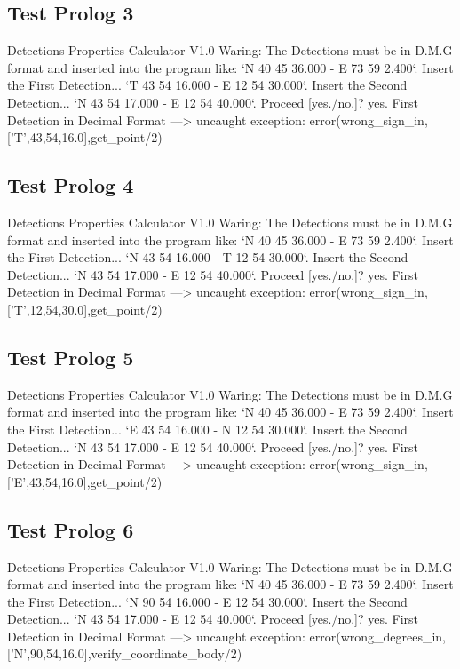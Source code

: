 \documentclass{article}
\begin{document}
\subsection*{Test Prolog 3}
	\begin{spverbatim}
		Detections Properties Calculator V1.0
		Waring: The Detections must be in D.M.G format and inserted into the program like: `N 40 45 36.000 - E 73 59 2.400`.
		Insert the First Detection...
		`T 43 54 16.000 - E 12 54 30.000`.
		Insert the Second Detection...
		`N 43 54 17.000 - E 12 54 40.000`.
		Proceed [yes./no.]?
		yes.
		First Detection in Decimal Format ---> 
		uncaught exception: error(wrong_sign_in,['T',43,54,16.0],get_point/2)
	\end{spverbatim}

\subsection*{Test Prolog 4}
	\begin{spverbatim}
		Detections Properties Calculator V1.0
		Waring: The Detections must be in D.M.G format and inserted into the program like: `N 40 45 36.000 - E 73 59 2.400`.
		Insert the First Detection...
		`N 43 54 16.000 - T 12 54 30.000`.
		Insert the Second Detection...
		`N 43 54 17.000 - E 12 54 40.000`.
		Proceed [yes./no.]?
		yes.
		First Detection in Decimal Format ---> 
		uncaught exception: error(wrong_sign_in,['T',12,54,30.0],get_point/2)
	\end{spverbatim}

\subsection*{Test Prolog 5}
	\begin{spverbatim}
		Detections Properties Calculator V1.0
		Waring: The Detections must be in D.M.G format and inserted into the program like: `N 40 45 36.000 - E 73 59 2.400`.
		Insert the First Detection...
		`E 43 54 16.000 - N 12 54 30.000`.
		Insert the Second Detection...
		`N 43 54 17.000 - E 12 54 40.000`.
		Proceed [yes./no.]?
		yes.
		First Detection in Decimal Format ---> 
		uncaught exception: error(wrong_sign_in,['E',43,54,16.0],get_point/2)
	\end{spverbatim}

\subsection*{Test Prolog 6}
	\begin{spverbatim}
		Detections Properties Calculator V1.0
		Waring: The Detections must be in D.M.G format and inserted into the program like: `N 40 45 36.000 - E 73 59 2.400`.
		Insert the First Detection...
		`N 90 54 16.000 - E 12 54 30.000`.
		Insert the Second Detection...
		`N 43 54 17.000 - E 12 54 40.000`.
		Proceed [yes./no.]?
		yes.
		First Detection in Decimal Format ---> 
		uncaught exception: error(wrong_degrees_in,['N',90,54,16.0],verify_coordinate_body/2)
	\end{spverbatim}
\end{document}
